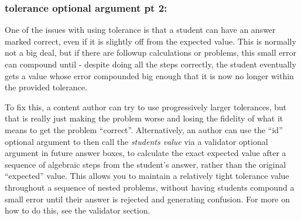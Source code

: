 \documentclass{ximera}
\begin{document}
        \subsubsection*{tolerance optional argument pt 2:} 
            One of the issues with using tolerance is that a student can have an answer marked correct, even if it is slightly off from the expected value. This is normally not a big deal, but if there are followup calculations or problems, this small error can compound until - despite doing all the steps correctly, the student eventually gets a value whose error compounded big enough that it is now no longer within the provided tolerance.
            
            To fix this, a content author can try to use progressively larger tolerances, but that is really just making the problem worse and losing the fidelity of what it means to get the problem ``correct''. Alternatively, an author can use the ``id'' optional argument to then call the \textit{students value} via a validator optional argument in future answer boxes, to calculate the exact expected value after a sequence of algebraic steps from the student's answer, rather than the original ``expected'' value. This allows you to maintain a relatively tight tolerance value throughout a sequence of nested problems, without having students compound a small error until their answer is rejected and generating confusion. For more on how to do this, see the validator section. 
        
\end{document}
